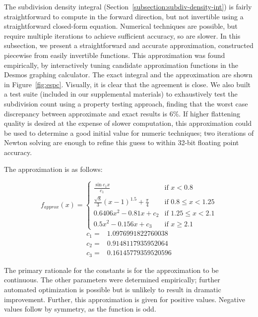 \documentclass[sigconf, nonacm]{acmart}
\begin{document}
The subdivision density integral (Section~\ref{subsection:subdiv-density-int}) is fairly straightforward to compute in the forward direction, but not invertible using a straightforward closed-form equation. Numerical techniques are possible, but require multiple iterations to achieve sufficient accuracy, so are slower. In this subsection, we present a straightforward and accurate approximation, constructed piecewise from easily invertible functions. This approximation was found empirically, by interactively tuning candidate approximation functions in the Desmos graphing calculator. The exact integral and the approximation are shown in Figure~\ref{fig:espc}. Visually, it is clear that the agreement is close. We also built a test suite (included in our supplemental materials) to exhaustively test the subdivision count using a property testing approach, finding that the worst case discrepancy between approximate and exact results is 6\%. If higher flattening quality is desired at the expense of slower computation, this approximation could be used to determine a good initial value for numeric techniques; two iterations of Newton solving are enough to refine this guess to within 32-bit floating point accuracy.

The approximation is as follows:

\[ 
    f_\mathit{approx}(x) = \left\{
        \begin{array}{rl}
            \frac{\sin c_1 x}{c_1} & \text{if } x < 0.8 \\
            \frac{\sqrt{8}}{3}(x-1)^{1.5} + \frac{\pi}{4} & \text{if } 0.8 \leq x < 1.25 \\
            0.6406x^2 - 0.81x + c_2 & \text{if } 1.25 \leq x < 2.1 \\
            0.5x^2 - 0.156x + c_3 & \text{if } x \geq 2.1
        \end{array}
        \right.
\]
\[
    \begin{array}{ll}
        c_1 = & 1.0976991822760038 \\
        c_2 = & 0.9148117935952064 \\
        c_3 = & 0.16145779359520596
    \end{array}
\]

The primary rationale for the constants is for the approximation to be continuous. The other parameters were determined empirically; further automated optimization is possible but is unlikely to result in dramatic improvement. Further, this approximation is given for positive values. Negative values follow by symmetry, as the function is odd.
\end{document}
